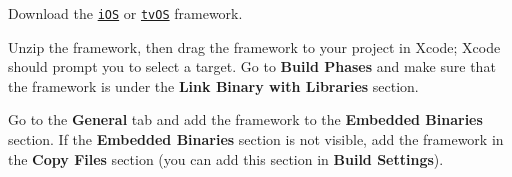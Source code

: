 \begin{DoxyEnumerate}
\item Download the \href{./OptimizelySDKUniversal/generated-frameworks/Release-iOS-universal-SDK/OptimizelySDKiOS.framework.zip}{\tt i\+OS} or \href{./OptimizelySDKUniversal/generated-frameworks/Release-tvOS-universal-SDK/OptimizelySDKTVOS.framework.zip}{\tt tv\+OS} framework.
\item Unzip the framework, then drag the framework to your project in Xcode; Xcode should prompt you to select a target. Go to {\bfseries Build Phases} and make sure that the framework is under the {\bfseries Link Binary with Libraries} section.
\item Go to the {\bfseries General} tab and add the framework to the {\bfseries Embedded Binaries} section. If the {\bfseries Embedded Binaries} section is not visible, add the framework in the {\bfseries Copy Files} section (you can add this section in {\bfseries Build Settings}).

\end{DoxyEnumerate}
